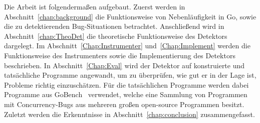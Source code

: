Die Arbeit ist folgendermaßen aufgebaut. Zuerst werden in Abschnitt~\ref{chap:background}
die Funktionsweise von Nebenläufigkeit in Go, sowie die zu detektierenden 
Bug-Situationen betrachtet. Anschließend wird in Abschnitt~\ref{chap:TheoDet}
die theoretische Funktionsweise des Detektors dargelegt.
Im Abschnitt~\ref{Chap:Instrumenter} und~\ref{Chap:Implement} werden 
die Funktionsweise des Instrumenters sowie die Implementierung des 
Detektors beschrieben. In Abschnitt~\ref{Chap:Eval} wird der Detektor auf 
konstruierte und tatsächliche Programme angewandt, um zu überprüfen, 
wie gut er in der Lage ist, Probleme richtig einzuschätzen. Für die 
tatsächlichen Programme werden dabei Programme aus GoBench~\cite{gobench}
verwendet, welche eine Sammlung von Programmen mit Concurrency-Bugs aus 
mehreren großen open-source Programmen besitzt. Zuletzt werden die 
Erkenntnisse in Abschnitt~\ref{chap:conclusion} zusammengefasst.
